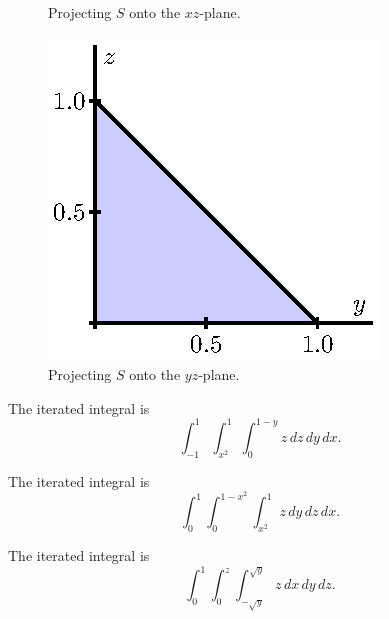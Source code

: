 \begin{activity}
\begin{figure}[ht]
\begin{center}
\begin{minipage}{1.75in}
\begin{center}
\end{center}
\caption{Projecting $S$ onto the $xz$-plane.}
\label{F:11.7.TI_Example_2_xz}
\end{minipage} \hspace{0.1in}
\begin{minipage}{1.75in}
\begin{center}
  \includegraphics{figures/fig_11_7_solid_proj_3.eps}
\end{center}
\caption{Projecting $S$ onto the $yz$-plane.}
\label{F:11.7.TI_Example_2_yz}
\end{minipage}
\end{center}
\end{figure}


\end{activity}
\begin{smallhint}

\end{smallhint}
\begin{bighint}

\end{bighint}
\begin{activitySolution}
    \ba
    \item The iterated integral is 
\[\int_{-1}^{1} \int_{x^2}^{1} \int_{0}^{1-y} z \, dz \, dy \, dx.\]

    \item The iterated integral is 
\[\int_{0}^{1} \int_{0}^{1-x^2} \int_{x^2}^{1} z \, dy \, dz \, dx.\]

	\item The iterated integral is 
\[\int_{0}^{1} \int_{0}^{z} \int_{-\sqrt{y}}^{\sqrt{y}} z \, dx \, dy \, dz.\]

	\ea
\end{activitySolution}
\aftera
